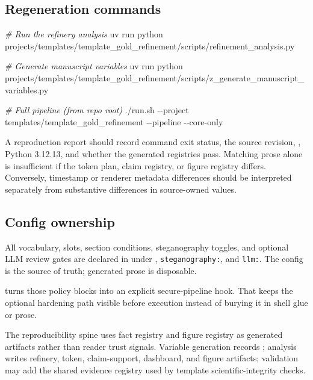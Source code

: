 \documentclass[
  english,
]{article}
\newenvironment{Shaded}{}{}
\newcommand{\AttributeTok}[1]{\textcolor[rgb]{0.49,0.56,0.16}{#1}}
\newcommand{\CommentTok}[1]{\textcolor[rgb]{0.38,0.63,0.69}{\textit{#1}}}
\newcommand{\ExtensionTok}[1]{#1}
\newcommand{\NormalTok}[1]{#1}
\begin{document}
\subsection{Regeneration commands}\label{regeneration-commands}

\begin{Shaded}
\begin{Highlighting}[]
\CommentTok{\# Run the refinery analysis}
\ExtensionTok{uv}\NormalTok{ run python projects/templates/template\_gold\_refinement/scripts/refinement\_analysis.py}

\CommentTok{\# Generate manuscript variables}
\ExtensionTok{uv}\NormalTok{ run python projects/templates/template\_gold\_refinement/scripts/z\_generate\_manuscript\_variables.py}

\CommentTok{\# Full pipeline (from repo root)}
\ExtensionTok{./run.sh} \AttributeTok{{-}{-}project}\NormalTok{ templates/template\_gold\_refinement }\AttributeTok{{-}{-}pipeline} \AttributeTok{{-}{-}core{-}only}
\end{Highlighting}
\end{Shaded}

A reproduction report should record command exit status, the source
revision, , Python 3.12.13, and whether the
generated registries pass. Matching prose alone is insufficient if the
token plan, claim registry, or figure registry differs. Conversely,
timestamp or renderer metadata differences should be interpreted
separately from substantive differences in source-owned values.

\subsection{Config ownership}\label{config-ownership}

All vocabulary, slots, section conditions, steganography toggles, and
optional LLM review gates are declared in
 under ,
\texttt{steganography:}, and \texttt{llm:}. The config is the source of
truth; generated prose is disposable.

 turns those policy blocks into an
explicit secure-pipeline hook. That keeps the optional hardening path
visible before execution instead of burying it in shell glue or prose.

The reproducibility spine uses fact registry and figure registry as
generated artifacts rather than reader trust signals. Variable
generation records ; analysis writes refinery,
token, claim-support, dashboard, and figure artifacts; validation may
add the shared evidence registry used by template scientific-integrity
checks.
\end{document}
